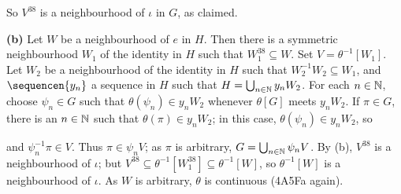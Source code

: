{{So $V^{38}$ is a neighbourhood of $\iota$ in $G$, as claimed.

\medskip

{\bf (b)} Let $W$ be a neighbourhood of $e$ in $H$.   Then there
is a symmetric neighbourhood $W_1$ of the identity in $H$ such that
$W_1^{38}\subseteq W$.   Set $V=\theta^{-1}[W_1]$.   Let $W_2$ be a
neighbourhood of the identity in $H$ such that
$W_2^{-1}W_2\subseteq W_1$, and
$\sequencen{y_n}$ a sequence in $H$ such that
$H=\bigcup_{n\in\Bbb N}y_nW_2$.
For each $n\in\Bbb N$, choose $\psi_n\in G$ such that
$\theta(\psi_n)\in y_nW_2$ whenever $\theta[G]$ meets $y_nW_2$.
If $\pi\in G$, there is an $n\in\Bbb N$ such that
$\theta(\pi)\in y_nW_2$;   in this case, $\theta(\psi_n)\in y_nW_2$, so


\noindent and
$\psi_n^{-1}\pi\in V$.   Thus $\pi\in\psi_nV$;  as $\pi$ is arbitrary,
$G=\bigcup_{n\in\Bbb N}\psi_nV$.   By (b), $V^{38}$ is a neighbourhood
of $\iota$;  but
$V^{38}\subseteq\theta^{-1}[W_1^{38}]\subseteq\theta^{-1}[W]$, so
$\theta^{-1}[W]$ is a neighbourhood of $\iota$.   As $W$ is
arbitrary, $\theta$ is continuous (4A5Fa again).
}%
}

